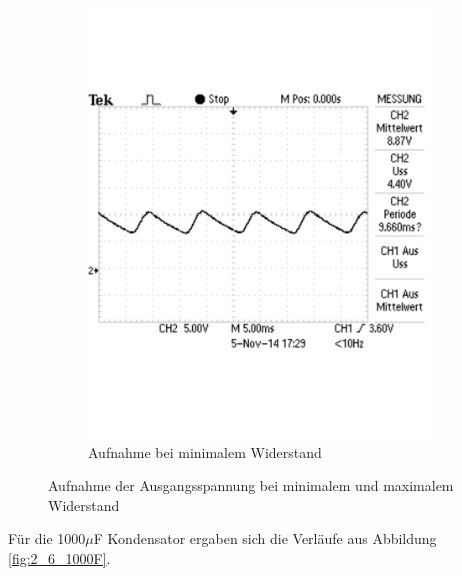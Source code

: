 \documentclass[12pt,a4paper]{article}
\begin{document}
\begin{figure}[H]
\begin{subfigure}[b]{0.48\textwidth}
                \includegraphics[width=\textwidth , scale = 0.4]{2_6_100F_2.pdf}
                \caption[Aufnahme bei minimalem Widerstand]{Aufnahme bei minimalem Widerstand}
  				\label{fig:2_6_100F_2}
        \end{subfigure}
        \caption{Aufnahme der Ausgangsspannung bei minimalem und maximalem Widerstand}
        \label{fig:2_6_100F}
\end{figure}

Für die 1000$\mu$F Kondensator ergaben sich die Verläufe aus Abbildung \ref{fig:2_6_1000F}.
\end{document}
